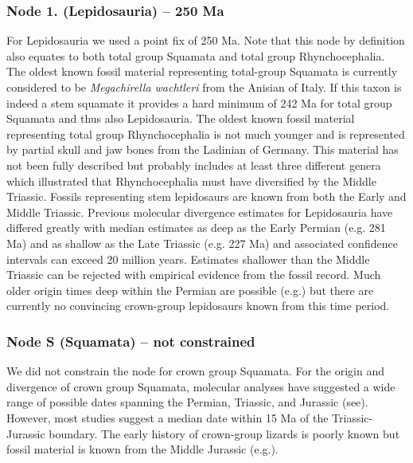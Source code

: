 \documentclass[a4paper, 12pt]{article}
\begin{document}
\subsubsection*{Node 1. (Lepidosauria) – 250 Ma}
For Lepidosauria we used a point fix of 250 Ma. Note that this node by definition also equates to both total group Squamata and total group Rhynchocephalia\cite{evans2003feet}. The oldest known fossil material representing total-group Squamata is currently considered to be \textit{Megachirella wachtleri} from the Anisian of Italy\cite{renesto2003new,simoes2018origin}. If this taxon is indeed a stem squamate it provides a hard minimum of 242 Ma for total group Squamata and thus also Lepidosauria. The oldest known fossil material representing total group Rhynchocephalia is not much younger and is represented by partial skull and jaw bones from the Ladinian of Germany\cite{jones2013integration,schoch2018tetrapod}. This material has not been fully described but probably includes at least three different genera which illustrated that Rhynchocephalia must have diversified by the Middle Triassic. Fossils representing stem lepidosaurs are known from both the Early and Middle Triassic\cite{evans2009small,schoch2018tetrapod}. Previous molecular divergence estimates for Lepidosauria have differed greatly with median estimates as deep as the Early Permian (e.g. 281 Ma) and as shallow as the Late Triassic (e.g. 227 Ma\cite{jones2013integration}) and associated confidence intervals can exceed 20 million years. Estimates shallower than the Middle Triassic can be rejected with empirical evidence from the fossil record\cite{jones2013integration,simoes2018origin}. Much older origin times deep within the Permian are possible (e.g.\cite{simoes2018origin}) but there are currently no convincing crown-group lepidosaurs known from this time period.  

\subsubsection*{Node S (Squamata) – not constrained}
We did not constrain the node for crown group Squamata. For the origin and divergence of crown group Squamata, molecular analyses have suggested a wide range of possible dates spanning the Permian, Triassic, and Jurassic (see\cite{jones2013integration}). However, most studies suggest a median date within 15 Ma of the Triassic-Jurassic boundary\cite{jones2013integration,simoes2018origin,burbrink2020interrogating}. The early history of crown-group lizards is poorly known but fossil material is known from the Middle Jurassic (e.g.\cite{evans1998crown,evans2003feet,evans2008skull}). 
\end{document}
